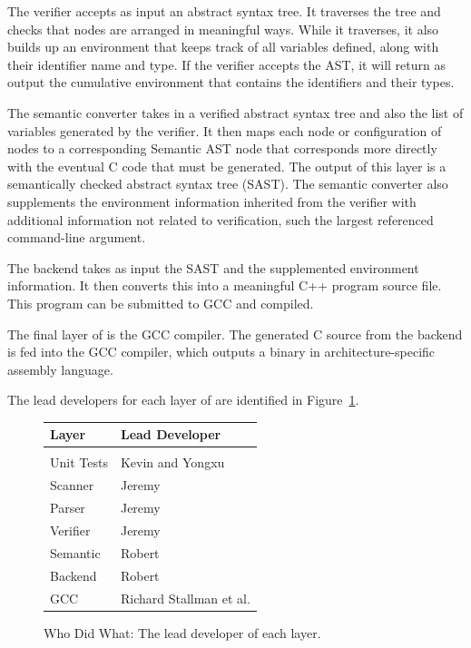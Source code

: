 The verifier accepts as input an abstract syntax tree. It traverses the
tree and checks that nodes are arranged in meaningful ways. While it
traverses, it also builds up an environment that keeps track of all
variables defined, along with their identifier name and type. If the
verifier accepts the AST, it will return as output the cumulative
environment that contains the identifiers and their types.

The semantic converter takes in a verified abstract syntax tree and also the
list of variables generated by the verifier. It then maps each node or
configuration of nodes to a corresponding Semantic AST node that
corresponds more directly with the eventual C code that must be generated.
The output of this layer is a semantically checked abstract syntax tree
(SAST). The semantic converter also supplements the environment information
inherited from the verifier with additional information not related to
verification, such the largest referenced command-line argument.


The backend takes as input the SAST and the supplemented environment
information. It then converts this into a meaningful C++ program source
file. This program can be submitted to GCC and compiled.

The final layer of \sys{} is the GCC compiler. The generated C source from
the backend is fed into the GCC compiler, which outputs a binary in
architecture-specific assembly language.

The lead developers for each layer of \sys{} are identified in
Figure~\ref{fig:leads}.


\begin{figure}
\begin{center}
\begin{tabular}{l | l}
{\bf Layer} & {\bf Lead Developer} \\
\hline \\
Unit Tests & Kevin and Yongxu \\
Scanner & Jeremy \\
Parser & Jeremy \\
Verifier & Jeremy \\
Semantic & Robert \\
Backend & Robert \\
GCC & Richard Stallman et al. \\
\end{tabular}
\caption{Who Did What: The lead developer of each layer.}
\end{center}
\label{fig:leads}
\end{figure}


